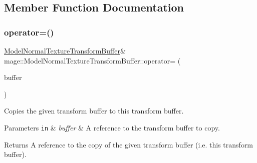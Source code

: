 \subsection{Member Function Documentation}
\hypertarget{structmage_1_1_model_normal_texture_transform_buffer_a5ce1f572ceecdb53b66d6f3f8f03e5f8}{}\label{structmage_1_1_model_normal_texture_transform_buffer_a5ce1f572ceecdb53b66d6f3f8f03e5f8} 
\subsubsection{\texorpdfstring{operator=()}{operator=()}\hspace{0.1cm}{\footnotesize\ttfamily [1/2]}}
{\footnotesize\ttfamily \hyperlink{structmage_1_1_model_normal_texture_transform_buffer}{Model\+Normal\+Texture\+Transform\+Buffer}\& mage\+::\+Model\+Normal\+Texture\+Transform\+Buffer\+::operator= (\begin{DoxyParamCaption}\item[{const \hyperlink{structmage_1_1_model_normal_texture_transform_buffer}{Model\+Normal\+Texture\+Transform\+Buffer} \&}]{buffer }\end{DoxyParamCaption})\hspace{0.3cm}{\ttfamily [default]}}

Copies the given transform buffer to this transform buffer.


\begin{DoxyParams}[1]{Parameters}
\mbox{\tt in}  & {\em buffer} & A reference to the transform buffer to copy. \\
\hline
\end{DoxyParams}
\begin{DoxyReturn}{Returns}
A reference to the copy of the given transform buffer (i.\+e. this transform buffer). 
\end{DoxyReturn}
\hypertarget{structmage_1_1_model_normal_texture_transform_buffer_aa5c10733681849e37988a9d1bf75a637}{}\label{structmage_1_1_model_normal_texture_transform_buffer_aa5c10733681849e37988a9d1bf75a637} 
